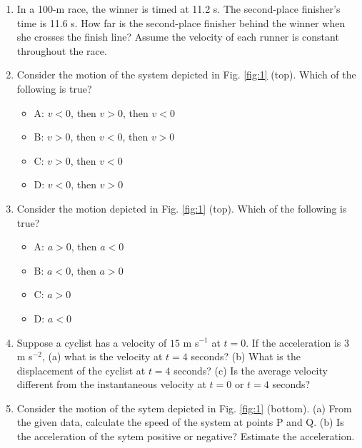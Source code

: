 \documentclass{article}
\begin{document}
\begin{enumerate}
\item In a 100-m race, the winner is timed at 11.2 s. The second-place finisher’s time is 11.6 s. How far is the second-place finisher behind the winner when she crosses the finish line? Assume the velocity of each runner is constant throughout the race. \\ \vspace{2cm}
\item Consider the motion of the system depicted in Fig. \ref{fig:1} (top).  Which of the following is true?
\begin{itemize}
\item A: $v<0$, then $v>0$, then $v<0$
\item B: $v>0$, then $v<0$, then $v>0$
\item C: $v>0$, then $v<0$
\item D: $v<0$, then $v>0$
\end{itemize}
\item Consider the motion depicted in Fig. \ref{fig:1} (top).  Which of the following is true?
\begin{itemize}
\item A: $a>0$, then $a<0$
\item B: $a<0$, then $a>0$
\item C: $a>0$
\item D: $a<0$
\end{itemize}
\item Suppose a cyclist has a velocity of $15$ m s$^{-1}$ at $t=0$.  If the acceleration is 3 m s$^{-2}$, (a) what is the velocity at $t = 4$ seconds? (b) What is the displacement of the cyclist at $t = 4$ seconds? (c) Is the average velocity different from the instantaneous velocity at $t=0$ or $t=4$ seconds?  \\ \vspace{3cm}
\item Consider the motion of the sytem depicted in Fig. \ref{fig:1} (bottom).  (a) From the given data, calculate the speed of the system at points P and Q. (b) Is the acceleration of the sytem positive or negative?  Estimate the acceleration.
\end{enumerate}
\end{document}
